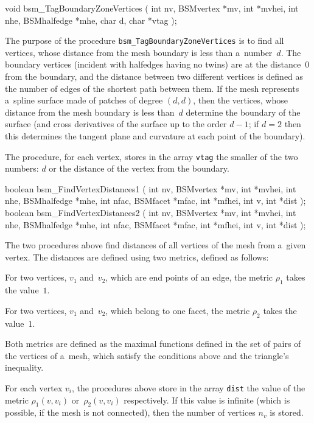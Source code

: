 \begin{listingC}
void bsm_TagBoundaryZoneVertices ( int nv, BSMvertex *mv, int *mvhei,
                                   int nhe, BSMhalfedge *mhe,
                                   char d, char *vtag );
\end{listingC}
The purpose of the procedure \texttt{bsm\_TagBoundaryZoneVertices} is to
find all vertices, whose distance from the mesh boundary is less than
a~number~$d$. The boundary vertices (incident with halfedges having no
twins) are at the distance~$0$ from the boundary, and the distance between
two different vertices is defined as the number of edges of the shortest
path between them. If the mesh represents a~spline surface made of patches
of degree $(d,d)$, then the vertices, whose distance from the mesh boundary
is less than~$d$ determine the boundary of the surface (and cross
derivatives of the surface up to the order $d-1$; if $d=2$ then this
determines the tangent plane and curvature at each point of the boundary).

The procedure, for each vertex, stores in the array \texttt{vtag} the
smaller of the two numbers: $d$ or the distance of the vertex from the
boundary.

\medskip
\begin{listingC}
boolean bsm_FindVertexDistances1 ( int nv, BSMvertex *mv, int *mvhei,
                                   int nhe, BSMhalfedge *mhe,
                                   int nfac, BSMfacet *mfac, int *mfhei,
                                   int v, int *dist );
boolean bsm_FindVertexDistances2 ( int nv, BSMvertex *mv, int *mvhei,
                                   int nhe, BSMhalfedge *mhe,
                                   int nfac, BSMfacet *mfac, int *mfhei,
                                   int v, int *dist );
\end{listingC}
The two procedures above find distances of all vertices of the mesh from
a~given vertex. The distances are defined using two metrics, defined as
follows:

For two vertices, $v_1$ and~$v_2$, which are end points of an edge, the
metric $\rho_1$ takes the value~$1$.

For two vertices, $v_1$ and~$v_2$, which belong to one facet, the
metric $\rho_2$ takes the value~$1$.

Both metrics are defined as the maximal functions defined in the set of
pairs of the vertices of a~mesh, which satisfy the conditions above and the
triangle's inequality.

For each vertex $v_i$, the procedures above store in the array \texttt{dist}
the value of the metric $\rho_1(v,v_i)$ or~$\rho_2(v,v_i)$ respectively.
If this value is infinite (which is possible, if the mesh is not connected),
then the number of vertices $n_v$ is stored.

